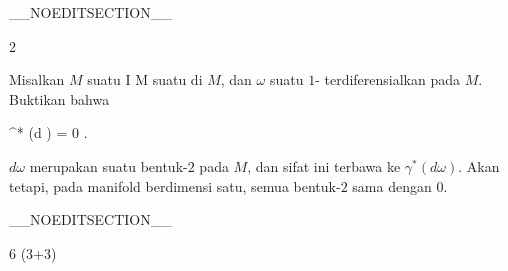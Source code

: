 __NOEDITSECTION__

{2}

{

Misalkan $M$ suatu
\maabb {\gamma} { I } { M
} {}
suatu
di $M$, dan $\omega$ suatu
$1$-
terdiferensialkan pada $M$. Buktikan bahwa

\mavergleichskettedisp
{\vergleichskette
{ \gamma^* (d \omega)
}
{ =} { 0
}
{ } {
}
{ } {
}
{ } {
}
}
{}{}{}.

}
{

$d \omega$ merupakan suatu bentuk-$2$ pada $M$, dan sifat ini terbawa ke $\gamma^*(d \omega)$. Akan tetapi, pada manifold berdimensi satu, semua bentuk-$2$ sama dengan $0$.

 }

__NOEDITSECTION__

{6 (3+3)}

